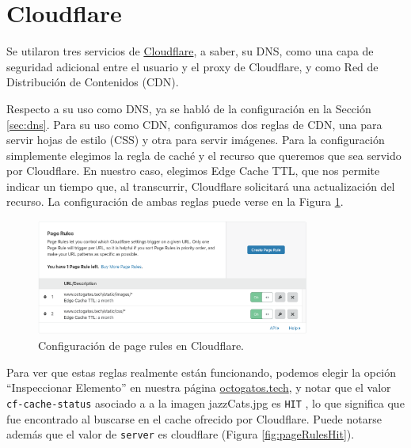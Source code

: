 \documentclass{article}
\newcommand{\ttt}[1]{%
\texttt{#1}%
}
\begin{document}

\newpage
\section{Cloudflare}

Se utilaron tres servicios de
\href{https://www.cloudflare.com/}{Cloudflare}, a saber,
su DNS, como una capa de seguridad adicional entre el
usuario y el proxy de Cloudflare, y como Red de
Distribuci\'on de Contenidos (CDN).

Respecto a su uso como DNS, ya se habl\'o de la
configuraci\'on en la Secci\'on \ref{sec:dns}.   Para
su uso como CDN, configuramos dos reglas de CDN, una
para servir hojas de estilo (CSS) y otra para servir
im\'agenes.   Para la configuraci\'on simplemente
elegimos la regla de cach\'e y el recurso que queremos
que sea servido por Cloudflare.   En nuestro caso,
elegimos Edge Cache TTL, que nos permite indicar
un tiempo que, al transcurrir, Cloudflare solicitar\'a
una actualizaci\'on del recurso.   La configuraci\'on
de ambas reglas puede verse en la Figura
\ref{fig:pageRules}.

\begin{figure}[H]
  \centering
  \includegraphics[width=0.8\textwidth]{cloudflare/pageRules}
  \caption{Configuraci\'on de page rules en Cloudflare.}
  \label{fig:pageRules}
\end{figure}

Para ver que estas reglas realmente est\'an funcionando,
podemos elegir la opci\'on ``Inspeccionar Elemento'' en
nuestra p\'agina \href{https://octogatos.tech}{octogatos.tech},
y notar que el valor \ttt{cf-cache-status} asociado a
a la imagen jazzCats.jpg es \ttt{HIT}, lo que significa que
fue encontrado al buscarse en el cache ofrecido por Cloudflare.
Puede notarse adem\'as que el valor de \ttt{server} es
cloudflare (Figura \ref{fig:pageRulesHit}).
\end{document}
